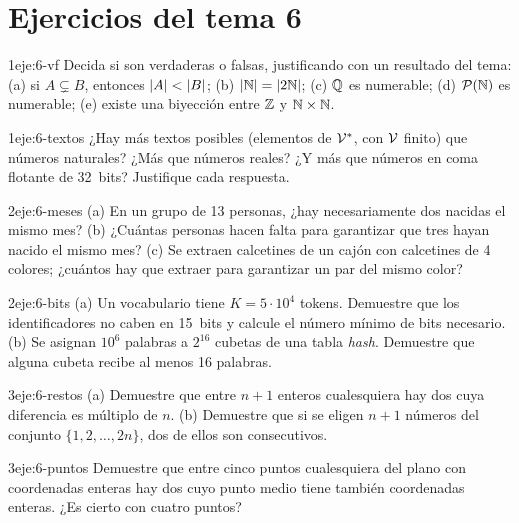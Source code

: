 \section*{Ejercicios del tema 6}

\begin{ejercicio}{1}{eje:6-vf}
Decida si son verdaderas o falsas, justificando con un resultado del tema: (a) si $A\subsetneq B$, entonces $\lvert A\rvert<\lvert B\rvert$; (b) $\lvert\mathbb{N}\rvert=\lvert2\mathbb{N}\rvert$; (c) $\mathbb{Q}$ es numerable; (d) $\mathcal{P}(\mathbb{N})$ es numerable; (e) existe una biyección entre $\mathbb{Z}$ y $\mathbb{N}\times\mathbb{N}$.
\end{ejercicio}

\begin{ejercicio}{1}{eje:6-textos}
¿Hay más textos posibles (elementos de $\mathcal{V}^{*}$, con $\mathcal{V}$ finito) que números naturales? ¿Más que números reales? ¿Y más que números en coma flotante de 32~bits? Justifique cada respuesta.
\end{ejercicio}

\begin{ejercicio}{2}{eje:6-meses}
(a) En un grupo de 13 personas, ¿hay necesariamente dos nacidas el mismo mes? (b) ¿Cuántas personas hacen falta para garantizar que tres hayan nacido el mismo mes? (c) Se extraen calcetines de un cajón con calcetines de 4 colores; ¿cuántos hay que extraer para garantizar un par del mismo color?
\end{ejercicio}

\begin{ejercicio}{2}{eje:6-bits}
(a) Un vocabulario tiene $K=5\cdot10^{4}$ tokens. Demuestre que los identificadores no caben en 15~bits y calcule el número mínimo de bits necesario. (b) Se asignan $10^{6}$ palabras a $2^{16}$ cubetas de una tabla \emph{hash}. Demuestre que alguna cubeta recibe al menos 16 palabras.
\end{ejercicio}

\begin{ejercicio}{3}{eje:6-restos}
(a) Demuestre que entre $n+1$ enteros cualesquiera hay dos cuya diferencia es múltiplo de $n$. (b) Demuestre que si se eligen $n+1$ números del conjunto $\{1,2,\dots,2n\}$, dos de ellos son consecutivos.
\end{ejercicio}

\begin{ejercicio}{3}{eje:6-puntos}
Demuestre que entre cinco puntos cualesquiera del plano con coordenadas enteras hay dos cuyo punto medio tiene también coordenadas enteras. ¿Es cierto con cuatro puntos?
\end{ejercicio}

